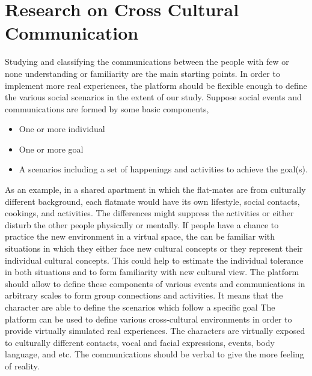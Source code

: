 \documentclass[conference]{IEEEtran}
\begin{document}
\section{Research on Cross Cultural Communication}

Studying and classifying the 
communications between the people with few or none understanding or familiarity are the main
starting points. In order to implement 
more real experiences, the platform should be flexible enough to define the 
various social scenarios in the extent of our study.
Suppose social events and communications are formed by some basic components,
\begin{itemize}
\item One or more individual
\item One or more goal
\item A scenarios including a set of happenings and activities to achieve the goal(s).
\end{itemize}
As an example, in a shared apartment in which the flat-mates are from culturally different background, each flatmate would have its own lifestyle, social contacts, cookings, and activities. The differences might suppress the activities or either disturb the other people physically or mentally. If people have a chance to practice the new environment in a virtual space, the can be familiar with situations in which they either face new cultural concepts or they represent their individual cultural concepts. This could help to estimate the individual tolerance in both situations and to form familiarity with new cultural view. 
The platform should allow to define these components of various events and communications in 
arbitrary scales to form group connections and activities. It means that the character are able to define the scenarios which follow a specific goal
The platform can be used to define various cross-cultural environments in order to
provide virtually simulated real experiences. The characters are virtually exposed to culturally
different contacts, vocal and facial expressions, events, body language, and etc.
The communications should be verbal to give the more feeling of reality. 

\end{document}

